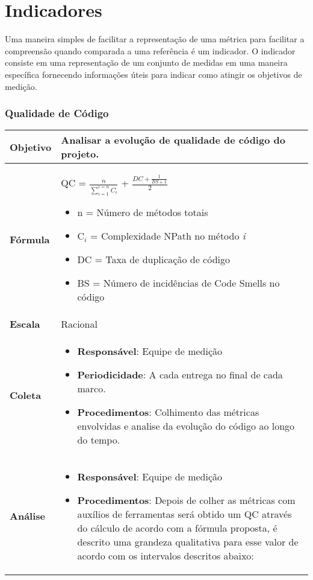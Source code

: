 \chapter{Indicadores}

Uma maneira simples de facilitar a representação de uma métrica para facilitar a compreensão quando comparada a uma referência é um indicador. O indicador consiste em uma representação de um conjunto de medidas em uma maneira específica fornecendo informações úteis para indicar como atingir os objetivos de medição.

\subsection{Qualidade de Código}

   \begin{tabular}{ |p{3cm}|p{12cm}| }
   \hline
    \textbf{Objetivo} & Analisar a evolução de qualidade de código do projeto. \\
   \hline
    \textbf{Fórmula} & QC = $\frac{n}{\sum_{i=1}^{i=n} C_i}$ + $\frac{DC + \frac{1}{BS + 1}}{2}$ \begin{itemize}
			\item n = Número de métodos totais
			\item C$_i$ = Complexidade NPath no método \textit{i}
			\item DC = Taxa de duplicação de código
			\item BS = Número de incidências de Code Smells no código
		\end{itemize}\\
   \hline
    \textbf{Escala} & Racional \\
   \hline
    \textbf{Coleta} & \begin{itemize}
		 \item \textbf{Responsável}: Equipe de medição
     \item \textbf{Periodicidade}: A cada entrega no final de cada marco.
     \item \textbf{Procedimentos}: Colhimento das métricas envolvidas e analise da evolução do código ao longo do tempo.
    \end{itemize} \\
   \hline
    \textbf{Análise} & \begin{itemize} \item \textbf{Responsável}: Equipe de medição
    \item \textbf{Procedimentos}: Depois de colher as métricas com auxílios de ferramentas será obtido um QC através do cálculo de acordo com a fórmula proposta, é descrito uma grandeza qualitativa para esse valor de acordo com os intervalos descritos abaixo:

\end{itemize}
\end{tabular}
